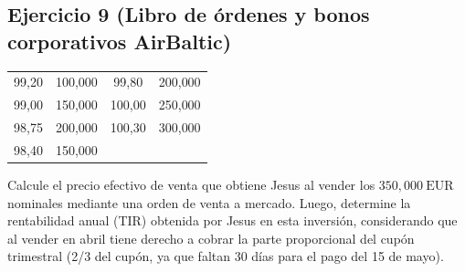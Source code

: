 \documentclass[12pt,a4paper]{article}
\newcommand{\EUR}[1]{\ensuremath{#1~\text{EUR}}}
\newenvironment{ejercicio}[1]{\subsection*{Ejercicio #1}}{}
\begin{document}
\begin{ejercicio}{9 (Libro de órdenes y bonos corporativos AirBaltic)}
\begin{enumerate}[label=\alph*)]
\begin{center}
\begin{tabular}{cc|cc}
  \midrule
  99{,}20 & 100{,}000 & 99{,}80 & 200{,}000\\
  99{,}00 & 150{,}000 & 100{,}00 & 250{,}000\\
  98{,}75 & 200{,}000 & 100{,}30 & 300{,}000\\
  98{,}40 & 150{,}000 &         &          \\
  \bottomrule
  \end{tabular}
  \end{center}
  Calcule el precio efectivo de venta que obtiene Jesus al vender los \EUR{350{,}000} nominales mediante una orden de venta a mercado. Luego, determine la rentabilidad anual (TIR) obtenida por Jesus en esta inversión, considerando que al vender en abril tiene derecho a cobrar la parte proporcional del cupón trimestral (2/3 del cupón, ya que faltan 30 días para el pago del 15 de mayo).
\end{enumerate}
\end{ejercicio}
\end{document}

